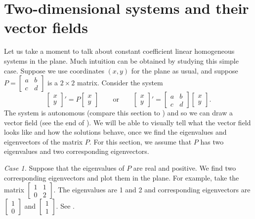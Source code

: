 
\sectionnewpage
\section{Two-dimensional systems and their vector fields}
\label{sec:twodimaut}


Let us take a moment to talk about constant coefficient linear
homogeneous systems in the plane.
Much intuition can be obtained by studying this simple case.
Suppose we use coordinates $(x,y)$ for the plane as usual,
and suppose
$P = \left[ \begin{smallmatrix} a & b \\ c & d \end{smallmatrix} \right]$ 
is a $2 \times 2$ matrix.  Consider the system
\begin{equation} \label{pln:eq}
\begin{bmatrix} x \\ y \end{bmatrix} ' =
P \begin{bmatrix} x \\ y \end{bmatrix} 
\qquad 
\text{or}
\qquad
\begin{bmatrix} x \\ y \end{bmatrix} ' =
\begin{bmatrix} a & b \\ c & d \end{bmatrix} 
\begin{bmatrix} x \\ y \end{bmatrix} 
.
\end{equation}
The system is autonomous (compare this section
to )
and so we can draw a vector field (see the end of
).
We will be able to visually tell what the vector field looks like and
how the solutions behave, once we find 
the eigenvalues and eigenvectors of the matrix $P$.
For this section,
we assume that $P$ has two eigenvalues and two corresponding
eigenvectors.

\medskip

\emph{Case 1.}  Suppose that the eigenvalues of $P$ are real and positive.
We find two corresponding eigenvectors and plot them in the plane.  For
example, take the
matrix $\left[ \begin{smallmatrix} 1 & 1 \\ 0 & 2 \end{smallmatrix}
\right]$.
The eigenvalues are 1 and 2 and corresponding eigenvectors are
$\left[ \begin{smallmatrix} 1 \\ 0 \end{smallmatrix} \right]$ and
$\left[ \begin{smallmatrix} 1 \\ 1 \end{smallmatrix} \right]$.  See
.

